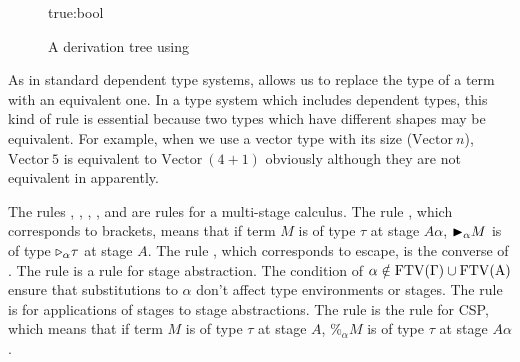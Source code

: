 \begin{figure}
	\begin{center}
		\begin{minipage}{0.50\hsize}
			{\textrm{true}:\textrm{bool} \in \Sigma \andalso
				 \andalso
			}
			\caption{A derivation tree using \TConst}
			\label{fig:tconst-derivation-tree}
		\end{minipage}
	\end{center}
\end{figure}


{}
As in standard dependent type systems, \TConv{} allows us to replace
the type of a term with an equivalent one.
In a type system which includes dependent types, this kind of rule is essential
because two types which have different shapes may be equivalent.
For example, when we use a vector type with its size ($\textrm{Vector}\ n$),
$\textrm{Vector}\ 5$ is equivalent to $\textrm{Vector}\ (4+1)$ obviously although they are not equivalent in apparently.

The rules \TTB, \TTBL, \TGen, \TIns, and \TCsp{} are rules for a multi-stage calculus.
The rule \TTB{}, which corresponds to brackets, means that if term $M$ is of type $\tau$ at stage $A\alpha$,
${\mathop{\blacktriangleright}}_\alpha M$ is of type ${\mathop{\triangleright}}_\alpha \tau$ at stage $A$.
The rule \TTBL{}, which corresponds to escape, is the converse of \TTB.
The rule \TGen{} is a rule for stage abstraction.
The condition of $\alpha\notin\rm{FTV}(\Gamma)\cup\rm{FTV}(A)$ ensure that
substitutions to $\alpha$ don't affect type environments or stages.
The rule \TIns{} is for applications of stages to stage abstractions.
The rule \TCsp is the rule for CSP, which means that 
if term $M$ is of type $\tau$ at stage $A$, $\%_\alpha M$ is of type $\tau$ at stage $A\alpha$.

